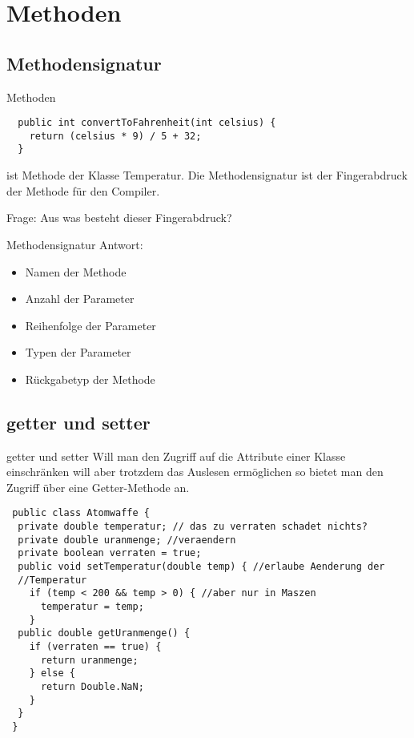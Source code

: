 \documentclass[18pt]{beamer}
\begin{document}
\section{Methoden}
\subsection{Methodensignatur}
\begin{frame}[fragile]{Methoden}
 \begin{lstlisting}
  public int convertToFahrenheit(int celsius) {
    return (celsius * 9) / 5 + 32;
  }
 \end{lstlisting}
 ist Methode der Klasse Temperatur. Die Methodensignatur ist der Fingerabdruck der Methode für den Compiler.
 
 Frage: Aus was besteht dieser Fingerabdruck?
\end{frame}

\begin{frame}{Methodensignatur}
Antwort:
 \begin{itemize}
  \item Namen der Methode
  \item Anzahl der Parameter
  \item Reihenfolge der Parameter
  \item Typen der Parameter
  \item Rückgabetyp der Methode
 \end{itemize}

\end{frame}

\subsection{getter und setter}
\begin{frame}[fragile]{getter und setter}
Will man den Zugriff auf die Attribute einer Klasse einschränken will aber trotzdem das Auslesen ermöglichen so bietet man den Zugriff über eine Getter-Methode an.
\begin{lstlisting}
 public class Atomwaffe {
  private double temperatur; // das zu verraten schadet nichts?
  private double uranmenge; //veraendern 
  private boolean verraten = true;
  public void setTemperatur(double temp) { //erlaube Aenderung der 
  //Temperatur
    if (temp < 200 && temp > 0) { //aber nur in Maszen
      temperatur = temp;
    }
  public double getUranmenge() {
    if (verraten == true) {
      return uranmenge;
    } else {
      return Double.NaN;
    }
  }
 }
\end{lstlisting}
\end{frame}
\end{document}
